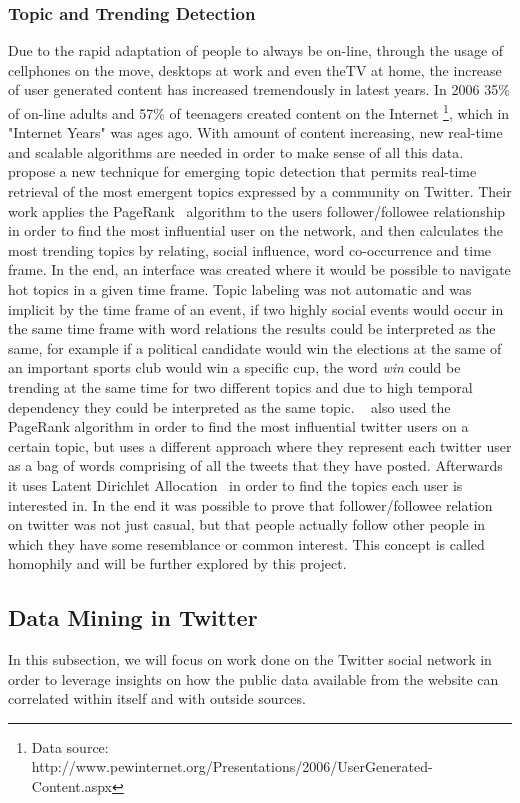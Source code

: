 \subsubsection{Topic and Trending Detection} 
\label{ssub:real_time_topic_and_trending_detection}
Due to the rapid adaptation of people to always be on-line, through the usage of cellphones on the move, desktops at work and even theTV at home, the increase of user generated content has increased tremendously in latest years. In 2006 35\% of on-line adults and 57\% of teenagers created content on the Internet \footnote{ Data source: http://www.pewinternet.org/Presentations/2006/UserGenerated-Content.aspx}, which in "Internet Years" was ages ago.
With amount of content increasing, new real-time and scalable algorithms are needed in order to make sense of all this data.
~\citet{Cataldi2010} propose a new technique for emerging topic detection that permits real-time retrieval of the most emergent topics expressed by a community on Twitter. Their work applies the PageRank~\cite{Pagerank1998} algorithm to the users follower/followee relationship in order to find the most influential user on the network, and then calculates the most trending topics by relating, social influence, word co-occurrence and time frame. In the end, an interface was created where it would be possible to navigate hot topics in a given time frame. Topic labeling was not automatic and was implicit by the time frame of an event, if two highly social events would occur in the same time frame with word relations the results could be interpreted as the same, for example if a political candidate would win the elections at the same of an important sports club would win a specific cup, the word \emph{win} could be trending at the same time for two different topics and due to high temporal dependency they could be interpreted as the same topic.
~\citet{Weng2010} also used the PageRank algorithm in order to find the most influential twitter users on a certain topic, but uses a different approach where they represent each twitter user as a bag of words comprising of all the tweets that they have posted. Afterwards it uses Latent Dirichlet Allocation~\cite{Blei2003} in order to find the topics each user is interested in. In the end it was possible to prove that follower/followee relation on twitter was not just casual, but that people actually follow other people in which they have some resemblance or common interest. This concept is called homophily and will be further explored by this project.

\subsection{Data Mining in Twitter } 
\label{sub:data_mining_in_twitter_}
In this subsection, we will focus on work done on the Twitter social network in order to leverage insights on how the public data available from the website can correlated within itself and with outside sources. 

